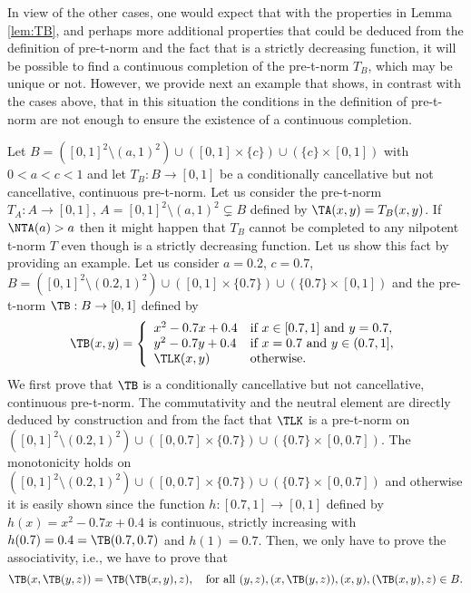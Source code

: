 In view of the other cases, one would expect that with the properties in Lemma \ref{lem:TB}, and perhaps more additional properties that could be deduced from the definition of pre-t-norm and the fact that \NTA is a strictly decreasing function, it will be possible to find a continuous completion of the pre-t-norm $T_B$, which may be unique or not. However, we provide next an example that shows, in contrast with the cases above, that in this situation the conditions in the definition of pre-t-norm are not enough to ensure the existence of a continuous completion.

\begin{example}\label{example:CounterexampleNTA(a)>a}
	Let $B = ([0,1]^2 \setminus (a,1)^2) \cup ([0,1] \times \{c\}) \cup (\{c\} \times [0,1])$ with $0<a<c<1$ and let $T_B : B \to [0,1]$ be a conditionally cancellative but not cancellative, continuous pre-t-norm. Let us consider the pre-t-norm $T_A : A \to [0,1]$, $A = [0,1]^2 \setminus (a,1)^2 \subsetneq B$ defined by $\TA(x,y)=T_B(x,y)$. If $\NTA(a)>a$ then it might happen that $T_B$ cannot be completed to any nilpotent t-norm $T$ even though \NTA is a strictly decreasing function. Let us show this fact by providing an example. Let us consider $a=0.2$, $c=0.7$, $B = ([0,1]^2 \setminus (0.2,1)^2) \cup ([0,1] \times \{0.7\}) \cup (\{0.7\} \times [0,1])$ and the pre-t-norm $\TB : B \to [0,1]$ defined by
	$$
	\TB(x,y)
	=
	\left\{ \begin{array}{ll}
		x^2-0.7x+0.4 & \text{if } x \in [0.7,1] \text{ and } y=0.7, \\
		y^2-0.7y+0.4& \text{if } x=0.7 \text{ and } y \in (0.7,1], \\
		\TLK(x,y) & \text{otherwise.}
	\end{array} \right.
	$$
	We first prove that $\TB$ is a conditionally cancellative but not cancellative, continuous pre-t-norm. The commutativity and the neutral element are directly deduced by construction and from the fact that $\TLK$ is a pre-t-norm on $([0,1]^2 \setminus (0.2,1)^2)\cup ([0,0.7] \times \{0.7\}) \cup (\{0.7\} \times [0,0.7])$. The monotonicity holds on $([0,1]^2 \setminus (0.2,1)^2) \cup ([0,0.7] \times \{0.7\}) \cup (\{0.7\} \times [0,0.7])$ and otherwise it is easily shown since the function $h:[0.7,1] \to [0,1]$ defined by $h(x)=x^2-0.7x+0.4$ is continuous, strictly increasing with $h(0.7)=0.4=\TB(0.7,0.7)$ and $h(1)=0.7$. Then, we only have to prove the associativity, i.e., we have to prove that
	$$\TB(x,\TB(y,z))=\TB(\TB(x,y),z), \quad \text{for all } (y,z), (x,\TB(y,z)), (x,y), (\TB(x,y),z)\in B.$$

\end{example}
